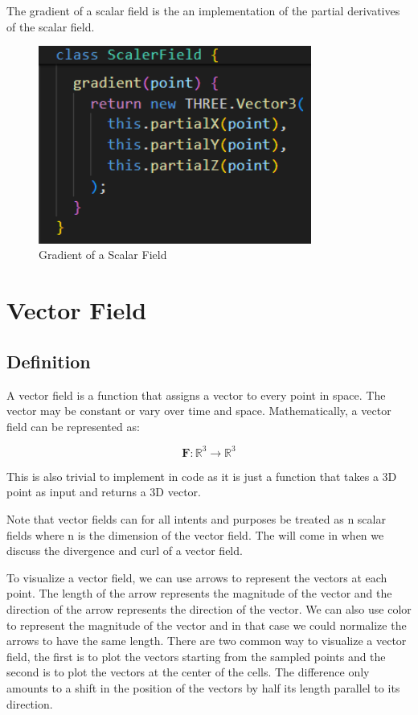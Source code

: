 \documentclass[12pt]{article}
\begin{document}
The gradient of a scalar field is the an implementation of the partial derivatives of the scalar field.

\begin{figure}[H]
    \centering
    \includegraphics[width=0.8\textwidth]{images/grad.png}
    \caption{Gradient of a Scalar Field\cite{El-Deeb_PEU-218_Stokes_Threejs}}
\end{figure}

\newpage
\section{Vector Field}
\subsection{Definition}

A vector field is a function that assigns a vector to every point in space. The vector may be constant or vary over time and space. Mathematically, a vector field can be represented as:

\[
    \mathbf{F}: \mathbb{R}^3 \rightarrow \mathbb{R}^3
\]

This is also trivial to implement in code as it is just a function that takes a 3D point as input and returns a 3D vector.

Note that vector fields can for all intents and purposes be treated as n scalar fields where n is the dimension of the vector field. The will come in when we discuss the divergence and curl of a vector field.

To visualize a vector field, we can use arrows to represent the vectors at each point. The length of the arrow represents the magnitude of the vector and the direction of the arrow represents the direction of the vector. We can also use color to represent the magnitude of the vector and in that case we could normalize the arrows to have the same length.
There are two common way to visualize a vector field, the first is to plot the vectors starting from the sampled points and the second is to plot the vectors at the center of the cells.
The difference only amounts to a shift in the position of the vectors by half its length parallel to its direction.
\end{document}
